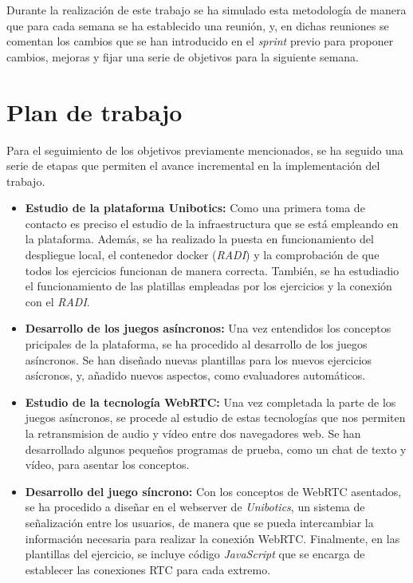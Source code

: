 \documentclass[a4paper, 12pt]{book}
\begin{document}
Durante la realización de este trabajo se ha simulado esta metodología de manera que para cada semana se ha establecido una reunión, y, en dichas reuniones se comentan los cambios que se han introducido en el \emph{sprint} previo para proponer cambios, mejoras y fijar una serie de objetivos para la siguiente semana.


\section{Plan de trabajo}
\label{sec:plan-de-trabajo}

Para el seguimiento de los objetivos previamente mencionados, se ha seguido una serie de etapas que permiten el avance incremental en la implementación del trabajo.

\begin{itemize}
\item \textbf{Estudio de la plataforma Unibotics:} Como una primera toma de contacto es preciso el estudio de la infraestructura que se está empleando en la plataforma. Además, se ha realizado la puesta en funcionamiento del despliegue local, el contenedor docker (\emph{RADI}) y la comprobación de que todos los ejercicios funcionan de manera correcta. También, se ha estudiadio el funcionamiento de las platillas empleadas por los ejercicios y la conexión con el \emph{RADI}.

\item \textbf{Desarrollo de los juegos asíncronos:} Una vez entendidos los conceptos pricipales de la plataforma, se ha procedido al desarrollo de los juegos asíncronos. Se han diseñado nuevas plantillas para los nuevos ejercicios asícronos, y, añadido nuevos aspectos, como evaluadores automáticos.

\item \textbf{Estudio de la tecnología WebRTC:} Una vez completada la parte de los juegos asíncronos, se procede al estudio de estas tecnologías que nos permiten la retransmision de audio y vídeo entre dos navegadores web. Se han desarrollado algunos pequeños programas de prueba, como un chat de texto y vídeo, para asentar los conceptos.

\item \textbf{Desarrollo del juego síncrono:} Con los conceptos de WebRTC asentados, se ha procedido a diseñar en el webserver de \emph{Unibotics}, un sistema de señalización entre los usuarios, de manera que se pueda intercambiar la información necesaria para realizar la conexión WebRTC. Finalmente, en las plantillas del ejercicio, se incluye código \emph{JavaScript} que se encarga de establecer las conexiones RTC para cada extremo.
\end{itemize}
\end{document}

